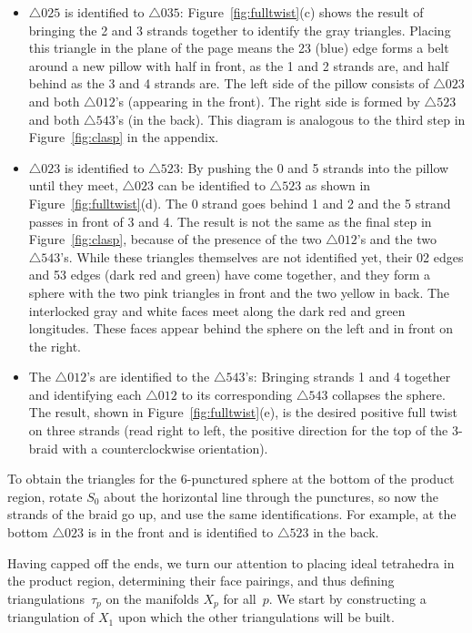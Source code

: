 \documentclass[reqno]{amsart}
\theoremstyle{plain}
\theoremstyle{definition}
\begin{document}
\begin{itemize}
\item $\triangle 025$ is identified to $\triangle 035$:  Figure~\ref{fig:fulltwist}(c) shows the result of bringing the 2 and 3 strands together to identify the gray triangles.  Placing this triangle in the plane of the page means the 23 (blue) edge forms a belt around a new pillow with half in front, as the 1 and 2 strands are, and half behind as the 3 and 4 strands are.  The left side of the pillow consists of $\triangle 023$ and both $\triangle 012$'s (appearing in the front).  The right side is formed by $\triangle 523$ and both $\triangle 543$'s (in the back).  This diagram is analogous to the third step in Figure~\ref{fig:clasp} in the appendix.
\item $\triangle 023$ is identified to $\triangle 523$:  By pushing the 0 and 5 strands into the pillow until they meet, $\triangle 023$ can be identified to $\triangle 523$ as shown in Figure~\ref{fig:fulltwist}(d).  The 0 strand goes behind 1 and 2 and the 5 strand passes in front of 3 and 4.  The result is not the same as the final step in Figure~\ref{fig:clasp}, because of the presence of the two $\triangle 012$'s and the two $\triangle 543$'s.  While these triangles themselves are not identified yet, their 02 edges and 53 edges (dark red and green) have come together, and they form a sphere with the two pink triangles in front and the two yellow in back.  The interlocked gray and white faces meet along the dark red and green longitudes.  These faces appear behind the sphere on the left and in front on the right.
\item The $\triangle 012$'s are identified to the $\triangle 543$'s:  Bringing strands 1 and 4 together and identifying each $\triangle 012$ to its corresponding $\triangle 543$ collapses the sphere.  The result, shown in Figure~\ref{fig:fulltwist}(e), is the desired positive full twist on three strands (read right to left, the positive direction for the top of the 3-braid with a counterclockwise orientation).  
\end{itemize}

To obtain the triangles for the 6-punctured sphere at the bottom of the product region, rotate $S_0$ about the horizontal line through the punctures, so now the strands of the braid go up, and use the same identifications.  For example, at the bottom $\triangle 023$ is in the front and is identified to $\triangle 523$ in the back.

Having capped off the ends, we turn our attention to placing ideal tetrahedra in the product region, determining their face pairings, and thus defining triangulations~$\tau_{p}$ on the manifolds $X_{p}$ for all~$p$.  We start by constructing a triangulation of $X_{1}$ upon which the other triangulations will be built. 
\end{document}

